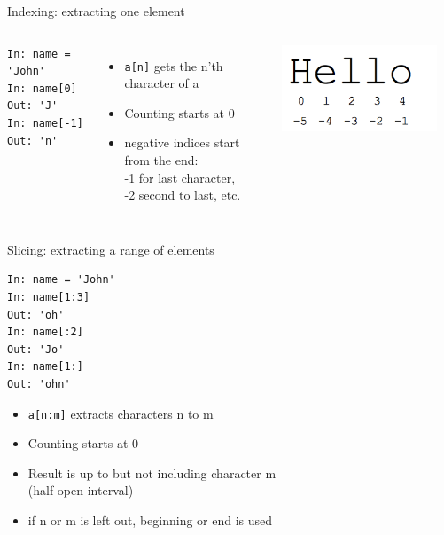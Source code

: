 \documentclass[aspectratio=169,usenames,dvipsnames]{beamer}
\begin{document}
\begin{frame}[fragile]{Indexing: extracting one element}
\begin{columns}
\begin{lstlisting}
In: name = 'John'
In: name[0]
Out: 'J'
In: name[-1]
Out: 'n'
\end{lstlisting}
    \begin{itemize}
        \item \lstinline{a[n]} gets the n'th character of a
        \item Counting starts at 0
        \item negative indices start from the end:\\
            -1 for last character, \\
            -2 second to last, etc.
    \end{itemize}
    \includegraphics[width=0.9\textwidth]{fig/indexing}
\end{columns}
\end{frame}

\begin{frame}[fragile]{Slicing: extracting a range of elements}
\begin{lstlisting}
In: name = 'John'
In: name[1:3]
Out: 'oh'
In: name[:2]
Out: 'Jo'
In: name[1:]
Out: 'ohn'
\end{lstlisting}
    \begin{itemize}
        \item \lstinline{a[n:m]} extracts characters n to m
        \item Counting starts at 0
        \item Result is up to but not including character m \\
                (half-open interval)
        \item if n or m is left out, beginning or end is used
    \end{itemize}
\end{frame}
\end{document}
